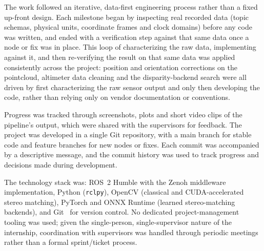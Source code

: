 The work followed an iterative, data-first engineering process rather than a fixed up-front design. Each milestone began by inspecting real recorded data (topic schemas, physical units, coordinate frames and clock domains) before any code was written, and ended with a verification step against that same data once a node or fix was in place. This loop of characterizing the raw data, implementing against it, and then re-verifying the result on that same data was applied consistently across the project: position and orientation corrections on the pointcloud, altimeter data cleaning and the disparity-backend search were all driven by first characterizing the raw sensor output and only then developing the code, rather than relying only on vendor documentation or conventions.

Progress was tracked through screenshots, plots and short video clips of the pipeline's output, which were shared with the supervisors for feedback. The project was developed in a single Git repository, with a main branch for stable code and feature branches for new nodes or fixes. Each commit was accompanied by a descriptive message, and the commit history was used to track progress and decisions made during development.

The technology stack was: ROS~2 Humble with the Zenoh middleware implementation, Python (\texttt{rclpy}), OpenCV (classical and CUDA-accelerated stereo matching), PyTorch and ONNX Runtime (learned stereo-matching backends), and Git~\cite{github} for version control. No dedicated project-management tooling was used; given the single-person, single-supervisor nature of the internship, coordination with supervisors was handled through periodic meetings rather than a formal sprint/ticket process.
